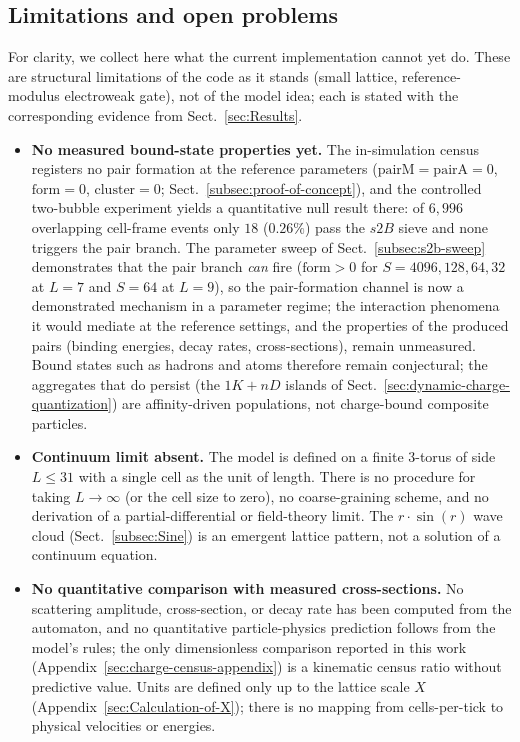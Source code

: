 \documentclass{ijuc}
\begin{document}
\subsection{Limitations and open problems}
For clarity, we collect here what the current implementation cannot yet do.  These are structural limitations of the code as it stands (small lattice, reference-modulus electroweak gate), not of the model idea; each is stated with the corresponding evidence from Sect.~\ref{sec:Results}.
\begin{itemize}
\item \textbf{No measured bound-state properties yet.}  The in-simulation census registers no pair formation at the reference parameters ($\mathrm{pairM}=\mathrm{pairA}=0$, $\mathrm{form}=0$, $\mathrm{cluster}=0$; Sect.~\ref{subsec:proof-of-concept}), and the controlled two-bubble experiment yields a quantitative null result there: of $6{,}996$ overlapping cell-frame events only $18$ ($0.26\%$) pass the $s2B$ sieve and none triggers the pair branch.  The parameter sweep of Sect.~\ref{subsec:s2b-sweep} demonstrates that the pair branch \emph{can} fire ($\mathrm{form}>0$ for $S=4096,128,64,32$ at $L=7$ and $S=64$ at $L=9$), so the pair-formation channel is now a demonstrated mechanism in a parameter regime; the interaction phenomena it would mediate at the reference settings, and the properties of the produced pairs (binding energies, decay rates, cross-sections), remain unmeasured.  Bound states such as hadrons and atoms therefore remain conjectural; the aggregates that do persist (the $1K+nD$ islands of Sect.~\ref{sec:dynamic-charge-quantization}) are affinity-driven populations, not charge-bound composite particles.
\item \textbf{Continuum limit absent.}  The model is defined on a finite $3$-torus of side $L\le31$ with a single cell as the unit of length.  There is no procedure for taking $L\to\infty$ (or the cell size to zero), no coarse-graining scheme, and no derivation of a partial-differential or field-theory limit.  The $r\cdot\sin(r)$ wave cloud (Sect.~\ref{subsec:Sine}) is an emergent lattice pattern, not a solution of a continuum equation.
\item \textbf{No quantitative comparison with measured cross-sections.}  No scattering amplitude, cross-section, or decay rate has been computed from the automaton, and no quantitative particle-physics prediction follows from the model's rules; the only dimensionless comparison reported in this work (Appendix~\ref{sec:charge-census-appendix}) is a kinematic census ratio without predictive value.  Units are defined only up to the lattice scale $X$ (Appendix~\ref{sec:Calculation-of-X}); there is no mapping from cells-per-tick to physical velocities or energies.

\end{itemize}
\end{document}

